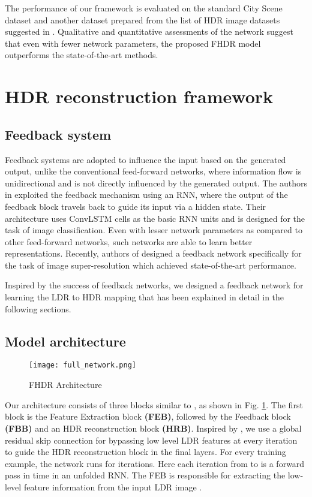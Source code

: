 \documentclass[conference]{IEEEtran}
\begin{document}
The performance of our framework is evaluated on the standard City Scene dataset \cite{zhang2017learning} and another dataset prepared from the list of HDR image datasets suggested in \cite{eilertsen2017hdr}. 
Qualitative and quantitative assessments of the network suggest that even with fewer network parameters, the proposed FHDR model outperforms the state-of-the-art methods.



\section{HDR reconstruction framework}
\subsection{Feedback system}
Feedback systems are adopted to influence the input based on the generated output, unlike the conventional feed-forward networks, where information flow is unidirectional and is not directly influenced by the generated output.
The authors in \cite{zamir2017feedback} exploited the feedback mechanism using an RNN, where the output of the feedback block travels back to guide its input via a hidden state. Their architecture uses ConvLSTM cells as the basic RNN units and is designed for the task of image classification. Even with lesser network parameters as compared to other feed-forward networks, such networks are able to learn better representations.
Recently, authors of \cite{li2019srfbn} designed a feedback network specifically for the task of image super-resolution which achieved state-of-the-art performance.
\par 
Inspired by the success of feedback networks, we designed a feedback network for learning the LDR to HDR mapping that has been explained in detail in the following sections.


\subsection{Model architecture}
\begin{figure}[htbp]
\centering
 \texttt{[image: full\_network.png]}
\caption{FHDR Architecture}
\label{fig1}
\end{figure}

Our architecture consists of three blocks similar to \cite{li2019srfbn}, as shown in Fig. \ref{fig1}. The first block is the Feature Extraction block \textbf{(FEB)}, followed by the Feedback block \textbf{(FBB)} and an HDR reconstruction block \textbf{(HRB)}. Inspired by \cite{zhang2018residual}, we use a global residual skip connection for bypassing low level LDR features at every iteration to guide the HDR reconstruction block in the final layers.
For every training example, the network runs for  iterations. Here each iteration from  to  is a forward pass in time in an unfolded RNN.
The FEB is responsible for extracting the low-level feature information  from the input LDR image .
\end{document}
